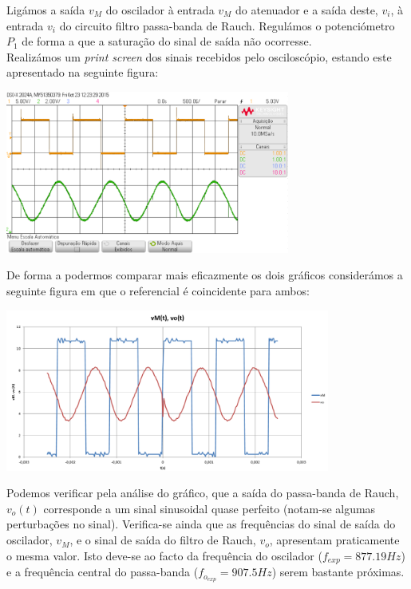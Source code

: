 \documentclass[a4paper,11pt]{report}
\begin{document}
Ligámos a saída $v_M$ do oscilador à entrada $v_M$ do atenuador e a saída deste, $v_i$, à entrada $v_i$ do circuito filtro passa-banda de Rauch. Regulámos o potenciómetro $P_1$ de forma a que a saturação do sinal de saída não ocorresse.\\
Realizámos um \textit{print screen} dos sinais recebidos pelo osciloscópio, estando este apresentado na seguinte figura:

\begin{center}
    \includegraphics[angle=0,width=0.7\textwidth]{Comp.png}
    \label{fig:Comp}
    \end{center}

De forma a podermos comparar mais eficazmente os dois gráficos considerámos a seguinte figura em que o referencial é coincidente para ambos:

\begin{center}
    \includegraphics[angle=0,width=0.8\textwidth]{Comp2.png}
    \label{fig:Comp2}
    \end{center}
    
    Podemos verificar pela análise do gráfico, que a saída do passa-banda de Rauch, $v_o(t)$ corresponde a um sinal sinusoidal quase perfeito (notam-se algumas perturbações no sinal). Verifica-se ainda que as frequências do sinal de saída do oscilador, $v_M$, e o sinal de saída do filtro de Rauch, $v_o$, apresentam praticamente o mesma valor. Isto deve-se ao facto da frequência do oscilador ($f_{exp}=877.19Hz$) e a frequência central do passa-banda ($f_{{o}_{exp}}=907.5Hz$) serem bastante próximas.
    
\end{document}
